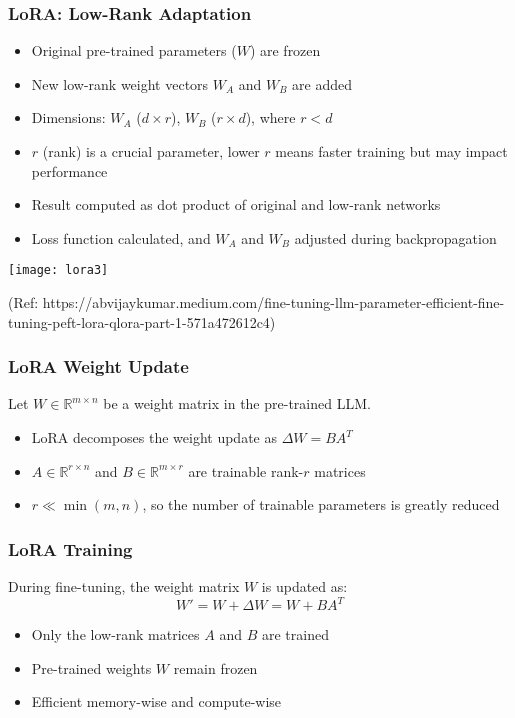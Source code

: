 \begin{frame}[fragile]\frametitle{LoRA: Low-Rank Adaptation}
    \begin{itemize}
        \item Original pre-trained parameters ($W$) are frozen
        \item New low-rank weight vectors $W_A$ and $W_B$ are added
        \item Dimensions: $W_A$ ($d \times r$), $W_B$ ($r \times d$), where $r < d$
        \item $r$ (rank) is a crucial parameter, lower $r$ means faster training but may impact performance
        \item Result computed as dot product of original and low-rank networks
        \item Loss function calculated, and $W_A$ and $W_B$ adjusted during backpropagation
    \end{itemize}

		\begin{center}
		\texttt{[image: lora3]}
		
		{\tiny (Ref: https://abvijaykumar.medium.com/fine-tuning-llm-parameter-efficient-fine-tuning-peft-lora-qlora-part-1-571a472612c4)}
		\end{center}

\end{frame}


\begin{frame}[fragile]\frametitle{LoRA Weight Update}
Let $W \in \mathbb{R}^{m \times n}$ be a weight matrix in the pre-trained LLM.
\begin{itemize}
    \item LoRA decomposes the weight update as $\Delta W = BA^T$
    \item $A \in \mathbb{R}^{r \times n}$ and $B \in \mathbb{R}^{m \times r}$ are trainable rank-$r$ matrices
    \item $r \ll \min(m, n)$, so the number of trainable parameters is greatly reduced
\end{itemize}
\end{frame}

\begin{frame}[fragile]\frametitle{LoRA Training}
During fine-tuning, the weight matrix $W$ is updated as:
$$W' = W + \Delta W = W + BA^T$$
\begin{itemize}
    \item Only the low-rank matrices $A$ and $B$ are trained
    \item Pre-trained weights $W$ remain frozen
    \item Efficient memory-wise and compute-wise
\end{itemize}
\end{frame}

